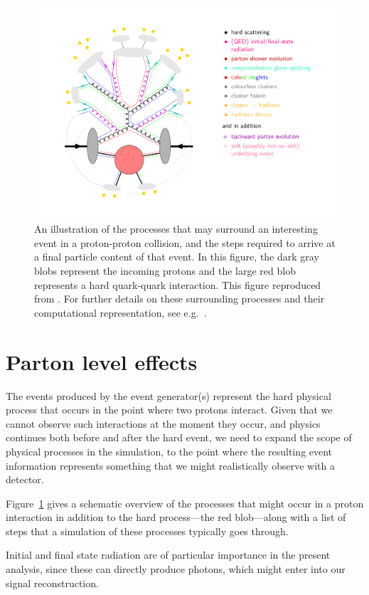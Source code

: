 \begin{figure}[htb]
\includegraphics[width=\textwidth]{figures/Zep-soft}
\caption{An illustration of the processes that may surround an interesting event in a proton-proton collision, and the steps required to arrive at a final particle content of that event. In this figure, the dark gray blobs represent the incoming protons and the large red blob represents a hard quark-quark interaction. This figure reproduced from \cite{zep}. For further details on these surrounding processes and their computational representation, see e.g.~\cite{pythman}.
\label{zep}}
\end{figure}

\section{Parton level effects}
The events produced by the event generator(s) represent the hard physical process that occurs in the point where two protons interact. Given that we cannot observe such interactions at the moment they occur, and physics continues both before and after the hard event, we need to expand the scope of physical processes in the simulation, to the point where the resulting event information represents something that we might realistically observe with a detector.

Figure~\ref{zep} gives a schematic overview of the processes that might occur in a proton interaction in addition to the hard process---the red blob---along with a list of steps that a simulation of these processes typically goes through.

Initial and final state radiation are of particular importance in the present analysis, since these can directly produce photons, which might enter into our signal reconstruction.

